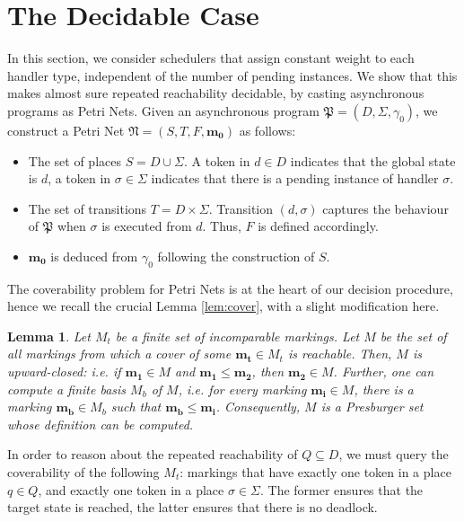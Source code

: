 \documentclass{article}
\newtheorem{lemma}[definition]{Lemma}
\theoremstyle{remark}
\newcommand{\program}{\mathfrak{P}}
\newcommand{\net}{\mathfrak{N}}
\begin{document}
\section{The Decidable Case}
In this section, we consider schedulers that assign constant weight to each handler type, independent of the number of pending instances. We show that this makes almost sure repeated reachability decidable, by casting asynchronous programs as Petri Nets. Given an asynchronous program $\program = (D, \Sigma, \gamma_0)$, we construct a Petri Net $\net = (S, T, F, \mathbf{m_0})$ as follows:
\begin{itemize}
\item The set of places $S = D \cup \Sigma$. A token in $d \in D$ indicates that the global state is $d$, a token in $\sigma \in \Sigma$ indicates that there is a pending instance of handler $\sigma$.
\item The set of transitions $T = D \times \Sigma$. Transition $(d, \sigma)$ captures the behaviour of $\program$ when $\sigma$ is executed from $d$. Thus, $F$ is defined accordingly.
\item $\mathbf{m_0}$ is deduced from $\gamma_0$ following the construction of $S$.
\end{itemize}

The coverability problem for Petri Nets is at the heart of our decision procedure, hence we recall the crucial Lemma \ref{lem:cover}, with a slight modification here.

\begin{lemma}
\label{lem:cover2}
Let $M_t$ be a finite set of incomparable markings. Let $M$ be the set of all markings from which a cover of some $\mathbf{m_t} \in M_t$ is reachable. Then, $M$ is upward-closed: i.e. if $\mathbf{m_1} \in M$ and $\mathbf{m_1} \le \mathbf{m_2}$, then $\mathbf{m_2} \in M$. Further, one can compute a finite basis $M_b$ of $M$, i.e. for every marking $\mathbf{m_i} \in M$, there is a marking $\mathbf{m_b} \in M_b$ such that $\mathbf{m_b} \le \mathbf{m_i}$. Consequently, $M$ is a Presburger set whose definition can be computed.
\end{lemma}

In order to reason about the repeated reachability of $Q \subseteq D$, we must query the coverability of the following $M_t$: markings that have exactly one token in a place $q \in Q$, and exactly one token in a place $\sigma \in \Sigma$. The former ensures that the target state is reached, the latter ensures that there is no deadlock.
\end{document}
